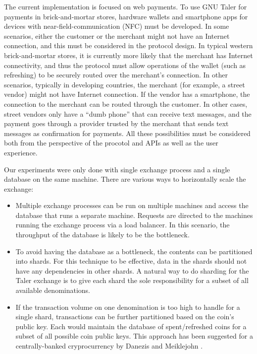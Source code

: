 The current implementation is focused on web payments.  To use GNU Taler for
payments in brick-and-mortar stores, hardware wallets and smartphone apps for
devices with near-field-communication (NFC) must be developed.  In some
scenarios, either the customer or the merchant might not have an Internet
connection, and this must be considered in the protocol design.  In typical
western brick-and-mortar stores, it is currently more likely that the merchant
has Internet connectivity, and thus the protocol must allow operations of the
wallet (such as refreshing) to be securely routed over the merchant's
connection.  In other scenarios, typically in developing countries, the
merchant (for example, a street vendor) might not have Internet connection.  If
the vendor has a smartphone, the connection to the merchant can be routed
through the customer.  In other cases, street vendors only have a ``dumb
phone'' that can receive text messages, and the payment goes through a provider
trusted by the merchant that sends text messages as confirmation for payments.
All these possibilities must be considered both from the perspective of the procotol and APIs
as well as the user experience.


Our experiments were only done with single exchange process and a single
database on the same machine.  There are various ways to horizontally scale the
exchange:
\begin{itemize}
  \item Multiple exchange processes can be run on multiple machines and access
    the database that runs a separate machine.  Requests are directed to the
    machines running the exchange process via a load balancer.  In this
    scenario, the throughput of the database is likely to be the bottleneck.
  \item To avoid having the database as a bottleneck, the contents can be
    partitioned into shards.  For this technique to be effective, data in the
    shards should not have any dependencies in other shards. A natural way to
    do sharding for the Taler exchange is to give each shard the sole
    responsibility for a subset of all available denominations.
  \item If the transaction volume on one denomination is too high to handle for
    a single shard, transactions can be further partitioned based on the coin's
    public key.  Each would maintain the database of spent/refreshed coins for
    a subset of all possible coin public keys.  This approach has been
    suggested for a centrally-banked cryprocurrency by Danezis and Meiklejohn
    \cite{danezis2016rscoin}.
\end{itemize}




